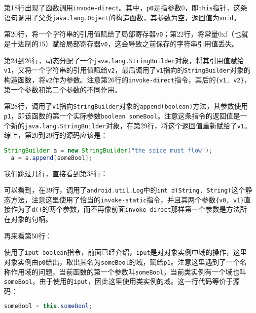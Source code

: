 第18行出现了函数调用\lstinline!invode-direct!。其中，\lstinline!p0!是指参数0，即\lstinline!this!指针，这条语句调用了父类\lstinline!java.lang.Object!的构造函数，其参数为空，返回值为\lstinline!void!。


第20行，将一个字符串的引用值赋给了局部寄存器\lstinline!v0!；第22行，将常量0xf（也就是十进制的15）赋给局部寄存器\lstinline!v0!，这会导致之前保存的字符串引用值丢失。

第24到26行，动态分配了一个\lstinline!java.lang.StringBuilder!对象，将其引用值赋给\lstinline!v1!，又将一个字符串的引用值赋给\lstinline!v2!，最后调用了\lstinline!v1!指向的\lstinline!StringBuilder!对象的构造函数，将\lstinline!v2!作为参数。注意第26行的\lstinline!invoke-direct!指令，其后的\lstinline!{v1, v2}!，第一个参数和第二个参数的不同作用。


第28行，调用了\lstinline!v1!指向\lstinline!StringBuilder!对象的\lstinline!append(boolean)!方法，其参数使用\lstinline!p1!，即该函数的第一个实际参数\lstinline!boolean someBool!。注意这条指令的返回值是一个新的\lstinline!java.lang.StringBuilder!对象，在第29行，将这个返回值重新赋给了\lstinline!v1!。综上，第20到29行的源码应该是：

\begin{lstlisting}[language=java, numbers=none]
  StringBuilder a = new StringBuilder("the spice must flow");
  a = a.append(someBool);
\end{lstlisting}

我们跳过几行，直接看到第38行：


可以看到，在39行，调用了\lstinline!android.util.Log!中的\lstinline!int d(String, String)!这个静态方法，注意这里使用了恰当的\lstinline!invoke-static!指令，并且其两个参数\lstinline!{v0, v1}!直接作为了\lstinline!d()!的两个参数，而不再像前面\lstinline!invoke-direct!那样第一个参数是方法所在对象的句柄。

再来看第50行：

使用了\lstinline!iput-boolean!指令，前面已经介绍，\lstinline!iput!是对对象实例中域的操作，这里对象实例由\lstinline!p0!给出，取出其名为\lstinline!someBool!的域，赋给\lstinline!p1!。注意这里遇到了一个名称作用域的问题，当前函数的第一个参数叫\lstinline!someBool!，当前类实例有一个域也叫\lstinline!someBool!，由于使用的\lstinline!iput!，因此这里使用类实例的域。这一行代码等价于源码：
\begin{lstlisting}[language=java, numbers=none]
  someBool = this.someBool;
\end{lstlisting}

